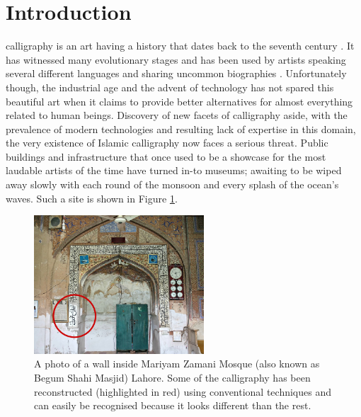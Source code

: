 \section{Introduction}
\label{Chapter:Introduction}
{
     calligraphy is an art having a history that dates back to the seventh century \cite{bib01, bib02}. It has witnessed many evolutionary stages \cite{bib02, bib03} and has been used by artists speaking several different languages \cite{bib04} and sharing uncommon biographies \cite{bib05,bib06,bib07,bib08}. Unfortunately though, the industrial age and the advent of technology has not spared this beautiful art when it claims to provide better alternatives for almost everything related to human beings. Discovery of new facets of calligraphy aside, with the prevalence of modern technologies and resulting lack of expertise in this domain, the very existence of Islamic calligraphy now faces a serious threat. Public buildings and infrastructure that once used to be a showcase for the most laudable artists of the time have turned in-to museums; awaiting to be wiped away slowly with each round of the monsoon and every splash of the ocean’s waves. Such a site is shown in Figure \ref{Fig:BegumShahi}.

    \begin{figure}[!t]
        \centering
        \includegraphics[width=2.5in]{../Images/BegumShahi.jpg}
        \caption{A photo of a wall inside Mariyam Zamani Mosque (also known as Begum Shahi Masjid) Lahore. Some of the calligraphy has been reconstructed (highlighted in red) using conventional techniques and can easily be recognised because it looks different than the rest.}
        \label{Fig:BegumShahi}
    \end{figure}
%
%


}
